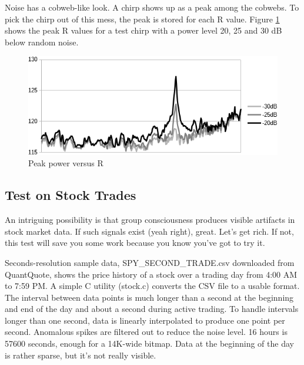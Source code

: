Noise has a cobweb-like look. A chirp shows up as a peak among the cobwebs.
To pick the chirp out of this mess, the peak is stored for each R value.
Figure \ref{fig:chirpRvalues1} shows the peak R values for a test chirp with a
power level 20, 25 and 30 dB below random noise.
\begin{figure}
  \includegraphics[width=\linewidth]{../source/Rpeaks.png}
  \caption{Peak power versus R}
  \label{fig:chirpRvalues1}
\end{figure}

\subsection{Test on Stock Trades}

An intriguing possibility is that
group consciousness produces visible artifacts in stock market data.
If such signals exist (yeah right), great. Let's get rich.
If not, this test will save you some work because you know you've got to try it.

Seconds-resolution sample data, SPY_SECOND_TRADE.csv downloaded from QuantQuote, 
shows the price history of a stock over a trading day from 4:00 AM to 7:59 PM.
A simple C utility (stock.c) converts the CSV file to a usable format.
The interval between data points is much longer than a second at the beginning
and end of the day and about a second during active trading. 
To handle intervals longer than one second,
data is linearly interpolated to produce one point per second.
Anomalous spikes are filtered out to reduce the noise level.
16 hours is 57600 seconds, enough for a 14K-wide bitmap.
Data at the beginning of the day is rather sparse, but it's not really visible.

